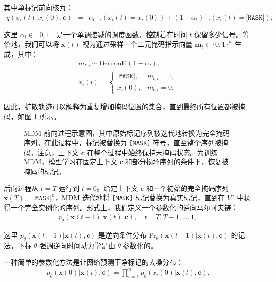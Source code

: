 \documentclass[UTF8,a4paper,zihao=-4,oneside,openany]{ctexbook}
\makeatletter
\newcommand{\AMLFigure}[2][0.96\linewidth]{%
  \begingroup
  \let\AtBeginDocument\@gobble
  \endgroup
}
\makeatother
\begin{document}
\noindent 其中单标记前向核为：
\begin{eqnarray}
q(x_i(t) | x_i(0), \mathbf{c}) & = &\alpha_t \cdot \mathbb{I}(x_i(t)=x_i(0)) + (1-\alpha_t)\cdot \mathbb{I}(x_i(t)=\texttt{[MASK]}). \label{eq:mdm-forward-absorbing}
\end{eqnarray}

\noindent 这里 $\alpha_t \in [0,1]$ 是一个单调递减的调度函数，控制着在时间 $t$ 保留多少信号。等价地，我们可以将 $\mathbf{x}(t)$ 视为通过采样一个二元掩码指示向量 $\mathbf{m}_t\in\{0,1\}^n$ 生成，其中：
\begin{eqnarray}
m_{t,i} \sim \mathrm{Bernoulli}(1-\alpha_t), \\
x_i(t) = \begin{cases}
\texttt{[MASK]}, & m_{t,i}=1, \\
x_i(0), & m_{t,i}=0.
\end{cases}
\label{eq:mdm-forward-maskvar}
\end{eqnarray}

\noindent 因此，扩散轨迹可以解释为重复增加掩码位置的集合，直到最终所有位置都被掩码，如图 \ref{fig:mdm-diffusion-process} 所示。

\begin{figure}[!t]
\centering
\AMLFigure{figure-mdm-diffusion-process}
\caption{MDM 前向过程示意图，其中原始标记序列被迭代地转换为完全掩码序列。在此过程中，标记被替换为 \texttt{[MASK]} 符号，直至整个序列被掩码。注意，上下文 $\mathbf{c}$ 在整个过程中始终保持未掩码状态。为训练 MDM，模型学习在固定上下文 $\mathbf{c}$ 和部分损坏序列的条件下，恢复被掩码的标记。}
\label{fig:mdm-diffusion-process}
\end{figure}

后向过程从 $t=T$ 运行到 $t=0$。给定上下文 $\mathbf{c}$ 和一个初始的完全掩码序列 $\mathbf{x}(T)=\texttt{[MASK]}^n$，MDM 迭代地将 \texttt{[MASK]} 标记替换为真实标记，直到在 $V^n$ 中获得一个完全实例化的序列。形式上，我们定义一个参数化的逆向马尔可夫链：
\begin{eqnarray}
p_\theta(\mathbf{x}(t-1)| \mathbf{x}(t), \mathbf{c}), \quad t=T,T-1,\dots,1,
\label{eq:mdm-reverse-kernel}
\end{eqnarray}

\noindent 这里 $p_\theta(\mathbf{x}(t-1)| \mathbf{x}(t),\mathbf{c})$ 是逆向条件分布 $\mathrm{Pr}_\theta(\mathbf{x}(t-1)| \mathbf{x}(t),\mathbf{c})$ 的记法，下标 $\theta$ 强调逆向时间动力学是由 $\theta$ 参数化的。

一种简单的参数化方法是让网络预测干净标记的去噪分布：
\begin{eqnarray}
p_\theta(\mathbf{x}(0)| \mathbf{x}(t), \mathbf{c}) = \prod_{i=1}^{n} p_\theta(x_i(0)| \mathbf{x}(t), \mathbf{c}).
\label{eq:mdm-denoise-factorize}
\end{eqnarray}
\end{document}
